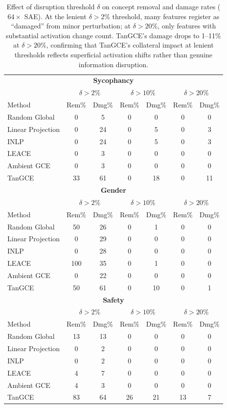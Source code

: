 \begin{table}[t]
\centering
\caption{Effect of disruption threshold $\delta$ on concept removal and damage rates ($64\times$ SAE). At the lenient $\delta{>}2\%$ threshold, many features register as ``damaged'' from minor perturbation; at $\delta{>}20\%$, only features with substantial activation change count. TanGCE's damage drops to 1--11\% at $\delta{>}20\%$, confirming that TanGCE's collateral impact at lenient thresholds reflects superficial activation shifts rather than genuine information disruption.}
\label{tab:damage_threshold}
\small
\setlength{\tabcolsep}{2.5pt}
\begin{tabular}{l|cc|cc|cc}
\toprule
\multicolumn{7}{c}{\textbf{Sycophancy}} \\
 & \multicolumn{2}{c|}{$\delta{>}2\%$} & \multicolumn{2}{c|}{$\delta{>}10\%$} & \multicolumn{2}{c}{$\delta{>}20\%$} \\
Method & Rem\% & Dmg\% & Rem\% & Dmg\% & Rem\% & Dmg\% \\
\midrule
Random Global & 0 & 5 & 0 & 0 & 0 & 0 \\
Linear Projection & 0 & 24 & 0 & 5 & 0 & 3 \\
INLP & 0 & 24 & 0 & 5 & 0 & 3 \\
LEACE & 0 & 3 & 0 & 0 & 0 & 0 \\
Ambient GCE & 0 & 3 & 0 & 0 & 0 & 0 \\
TanGCE & 33 & 61 & 0 & 18 & 0 & 11 \\
\midrule
\midrule
\multicolumn{7}{c}{\textbf{Gender}} \\
 & \multicolumn{2}{c|}{$\delta{>}2\%$} & \multicolumn{2}{c|}{$\delta{>}10\%$} & \multicolumn{2}{c}{$\delta{>}20\%$} \\
Method & Rem\% & Dmg\% & Rem\% & Dmg\% & Rem\% & Dmg\% \\
\midrule
Random Global & 50 & 26 & 0 & 1 & 0 & 0 \\
Linear Projection & 0 & 29 & 0 & 0 & 0 & 0 \\
INLP & 0 & 28 & 0 & 0 & 0 & 0 \\
LEACE & 100 & 35 & 0 & 1 & 0 & 0 \\
Ambient GCE & 0 & 22 & 0 & 0 & 0 & 0 \\
TanGCE & 50 & 61 & 0 & 10 & 0 & 1 \\
\midrule
\midrule
\multicolumn{7}{c}{\textbf{Safety}} \\
 & \multicolumn{2}{c|}{$\delta{>}2\%$} & \multicolumn{2}{c|}{$\delta{>}10\%$} & \multicolumn{2}{c}{$\delta{>}20\%$} \\
Method & Rem\% & Dmg\% & Rem\% & Dmg\% & Rem\% & Dmg\% \\
\midrule
Random Global & 13 & 13 & 0 & 0 & 0 & 0 \\
Linear Projection & 0 & 2 & 0 & 0 & 0 & 0 \\
INLP & 0 & 2 & 0 & 0 & 0 & 0 \\
LEACE & 4 & 7 & 0 & 0 & 0 & 0 \\
Ambient GCE & 4 & 3 & 0 & 0 & 0 & 0 \\
TanGCE & 83 & 64 & 26 & 21 & 13 & 7 \\
\bottomrule
\end{tabular}
\end{table}
